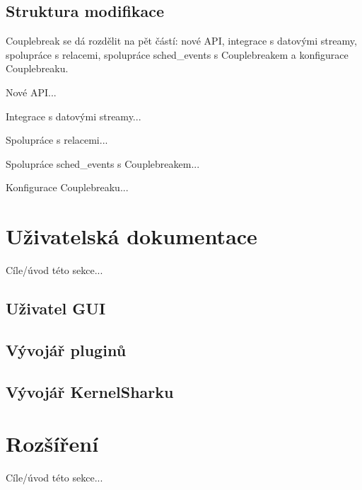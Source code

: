 \subsection{Struktura modifikace}
Couplebreak se dá rozdělit na pět částí: nové API, integrace s datovými streamy, spolupráce s relacemi, spolupráce sched\_events s Couplebreakem a konfigurace Couplebreaku. 

Nové API...

Integrace s datovými streamy...

Spolupráce s relacemi...

Spolupráce sched\_events s Couplebreakem...

Konfigurace Couplebreaku...

\section{Uživatelská dokumentace}

Cíle/úvod této sekce...

\subsection{Uživatel GUI}

\subsection{Vývojář pluginů}

\subsection{Vývojář KernelSharku}

\section{Rozšíření}

Cíle/úvod této sekce...

